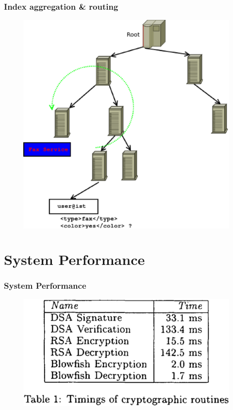 \documentclass{beamer}
\begin{document}
\begin{frame}[fragile] %
\frametitle{Index aggregation \& routing}
\begin{figure}
\includegraphics[scale=0.4]{d4}
\end{figure}
\end{frame}

\section{System Performance}
\begin{frame}[fragile] %
\frametitle{System Performance}
\begin{figure}
\includegraphics[scale=0.2]{t1}
\end{figure}
\end{frame}
\end{document}
